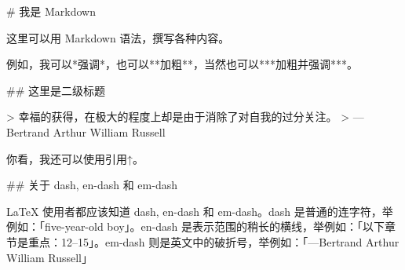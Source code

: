 \documentclass[UTF8]{ctexart}
\begin{document}
\begin{markdown}
# 我是 Markdown

这里可以用 Markdown 语法，撰写各种内容。

例如，我可以*强调*，也可以**加粗**，当然也可以***加粗并强调***。

## 这里是二级标题

> 幸福的获得，在极大的程度上却是由于消除了对自我的过分关注。
> ---Bertrand Arthur William Russell

你看，我还可以使用引用↑。

## 关于 dash, en-dash 和 em-dash

LaTeX 使用者都应该知道 dash, en-dash 和 em-dash。dash 是普通的连字符，举例如：「five-year-old boy」。en-dash 是表示范围的稍长的横线，举例如：「以下章节是重点：12--15」。em-dash 则是英文中的破折号，举例如：「---Bertrand Arthur William Russell」
\end{markdown}
\end{document}
